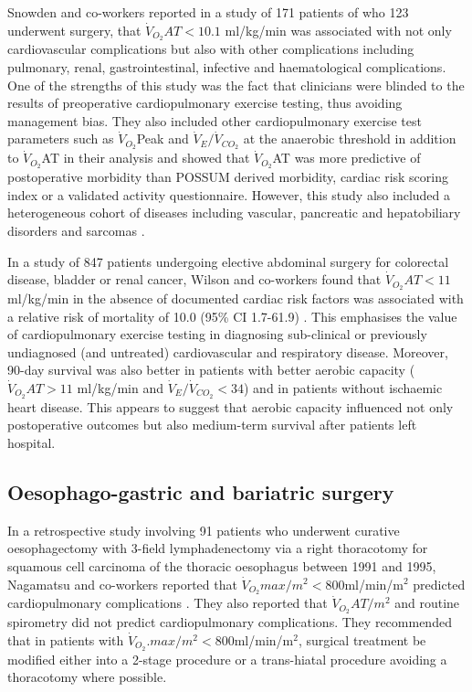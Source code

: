 Snowden and co-workers reported in a study of 171 patients of who 123 underwent surgery, that $\dot{V}_{O_2}AT<10.1$ ml/kg/min was associated with not only cardiovascular complications but also with other complications including pulmonary, renal, gastrointestinal, infective and haematological complications. 
One of the strengths of this study was the fact that clinicians were blinded to the results of preoperative cardiopulmonary exercise testing, thus avoiding management bias. 
They also included other cardiopulmonary exercise test parameters such as $\dot{V}_{O_2}$Peak and $\dot{V}_E/\dot{V}_{CO_2}$ at the anaerobic threshold in addition to $\dot{V}_{O_2}$AT in their analysis and showed that $\dot{V}_{O_2}$AT was more predictive of postoperative morbidity than POSSUM derived morbidity, cardiac risk scoring index or a validated activity questionnaire. 
However, this study also included a heterogeneous cohort of diseases including vascular, pancreatic and hepatobiliary disorders and sarcomas \parencite{snowden_submaximal_2010}. 

In a study of 847 patients undergoing elective abdominal surgery for colorectal disease, bladder or renal cancer, Wilson and co-workers found that $\dot{V}_{O_2}AT<11$ ml/kg/min in the absence of documented cardiac risk factors was associated with a relative risk of mortality of 10.0 (95\% CI 1.7-61.9) \parencite{wilson_impaired_2010}. 
This emphasises the value of cardiopulmonary exercise testing in diagnosing sub-clinical or previously undiagnosed (and untreated) cardiovascular and respiratory disease. 
Moreover, 90-day survival was also better in patients with better aerobic capacity ($\dot{V}_{O_2}AT>11$ ml/kg/min and $\dot{V}_E/\dot{V}_{CO_2}<34$) and in patients without ischaemic heart disease. 
This appears to suggest that aerobic capacity influenced not only postoperative outcomes but also medium-term survival after patients left hospital.

\subsection{Oesophago-gastric and bariatric surgery}
In a retrospective study involving 91 patients who underwent curative oesophagectomy with 3-field lymphadenectomy via a right thoracotomy for squamous cell carcinoma of the thoracic oesophagus between 1991 and 1995, Nagamatsu and co-workers reported that $\dot{V}_{O_2}max/m^2<800$ml/min/m$^2$ predicted cardiopulmonary complications \parencite{nagamatsu_preoperative_2001}. 
They also reported that $\dot{V}_{O_2}AT/m^2$ and routine spirometry did not predict cardiopulmonary complications. 
They recommended that in patients with $\dot{V}_{O_2}. 
max/m^2<800$ml/min/m$^2$, surgical treatment be modified either into a 2-stage procedure or a trans-hiatal procedure avoiding a thoracotomy where possible.

